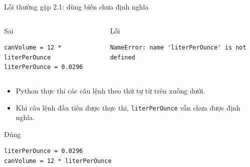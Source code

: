 \documentclass[aspectratio=169,10pt]{beamer}
\begin{document}
\begin{frame}[fragile]{Lỗi thường gặp 2.1: dùng biến chưa định nghĩa}
\begin{columns}[T,onlytextwidth]
\begin{alertblock}{Sai}
\begin{lstlisting}
canVolume = 12 * literPerOunce
literPerOunce = 0.0296
\end{lstlisting}
\end{alertblock}
\begin{block}{Lỗi}
\begin{lstlisting}[language={}]
NameError: name 'literPerOunce' is not defined
\end{lstlisting}
\end{block}
\end{columns}
\begin{itemize}
  \item Python thực thi các câu lệnh theo thứ tự từ trên xuống dưới.
  \item Khi câu lệnh đầu tiên được thực thi, \texttt{literPerOunce} vẫn chưa được định nghĩa.
\end{itemize}
\begin{block}{Đúng}
\begin{lstlisting}
literPerOunce = 0.0296
canVolume = 12 * literPerOunce
\end{lstlisting}
\end{block}
\end{frame}
\end{document}
